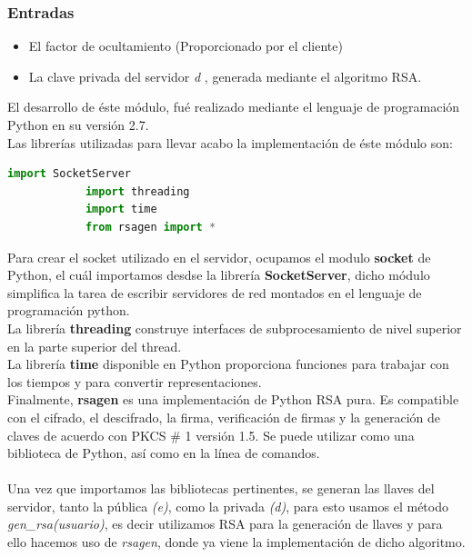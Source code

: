 \subsubsection{Entradas}
\begin{itemize}
	\item El factor de ocultamiento (Proporcionado por el cliente)
	\item La clave privada del servidor \textit{d} , generada mediante el algoritmo RSA. 
\end{itemize}

El desarrollo de éste módulo, fué realizado mediante el lenguaje de programación Python en su versión 2.7. \\
Las librerías utilizadas para llevar acabo la implementación de éste módulo son: 

\begin{lstlisting}[language=Python,frame=single, keywordstyle=\color{blue}]
			import SocketServer
			import threading
			import time
			from rsagen import *
\end{lstlisting}

Para crear el socket utilizado en el servidor, ocupamos el modulo \textbf{socket} de Python, el cuál importamos desdse la librería \textbf{SocketServer}, dicho módulo simplifica la tarea de escribir servidores de red montados en el lenguaje de programación python. \\ La librería \textbf{threading} construye interfaces de subprocesamiento de nivel superior en la parte superior del thread.\\
La librería \textbf{time} disponible en Python proporciona funciones para trabajar con los tiempos y para convertir representaciones. \\
Finalmente,\textbf{ rsagen} es una implementación de Python RSA pura. Es compatible con el cifrado,  el descifrado, la firma, verificación de firmas y la generación de claves de acuerdo con PKCS \# 1 versión 1.5. Se puede utilizar como una biblioteca de Python, así como en la línea de comandos.
\\ \\ 

Una vez que importamos las bibliotecas pertinentes, se generan las llaves del servidor, tanto la pública \textit{(e)}, como la privada \textit{(d)}, para esto usamos el método \textit{gen\_rsa(usuario)}, es decir utilizamos RSA para la generación de llaves y para ello hacemos uso de \textit{rsagen}, donde ya viene la implementación de dicho algoritmo. \\ 

